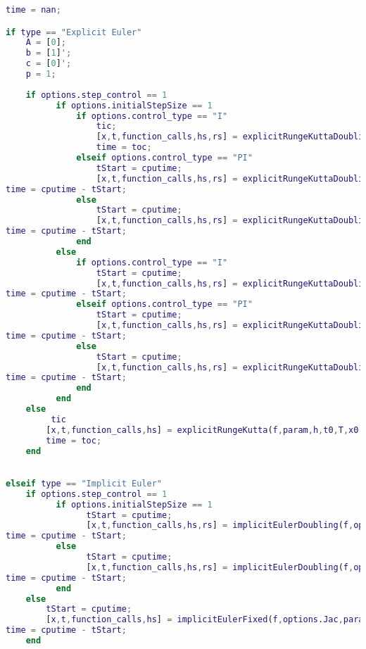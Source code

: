 \begin{lstlisting}[language=Matlab,caption=ODEsolver wrapper,label=lst0:wrapper]
time = nan;

if type == "Explicit Euler"
    A = [0];
    b = [1]';
    c = [0]';
    p = 1;
    
    if options.step_control == 1 
          if options.initialStepSize == 1
              if options.control_type == "I"
                  tic;
                  [x,t,function_calls,hs,rs] = explicitRungeKuttaDoubling(f,param,h,t0,T,x0,A,b,c,Atol,Rtol,hmin,hmax,eps_tol,p,true); % euler with everything
                  time = toc;
              elseif options.control_type == "PI"
                  tStart = cputime;
                  [x,t,function_calls,hs,rs] = explicitRungeKuttaDoublingPI(f,param,h,t0,T,x0,A,b,c,Atol,Rtol,hmin,hmax,eps_tol,p,true); % euler with everything
time = cputime - tStart;
              else
                  tStart = cputime;
                  [x,t,function_calls,hs,rs] = explicitRungeKuttaDoublingPID(f,param,h,t0,T,x0,A,b,c,Atol,Rtol,hmin,hmax,eps_tol,p,true); % euler with everything
time = cputime - tStart;
              end
          else
              if options.control_type == "I"
                  tStart = cputime;
                  [x,t,function_calls,hs,rs] = explicitRungeKuttaDoubling(f,param,h,t0,T,x0,A,b,c,Atol,Rtol,hmin,hmax,eps_tol,p,false); % euler with everything
time = cputime - tStart;
              elseif options.control_type == "PI"
                  tStart = cputime;
                  [x,t,function_calls,hs,rs] = explicitRungeKuttaDoublingPI(f,param,h,t0,T,x0,A,b,c,Atol,Rtol,hmin,hmax,eps_tol,p,false); % euler with everything
time = cputime - tStart;
              else
                  tStart = cputime;
                  [x,t,function_calls,hs,rs] = explicitRungeKuttaDoublingPID(f,param,h,t0,T,x0,A,b,c,Atol,Rtol,hmin,hmax,eps_tol,p,false); % euler with everything
time = cputime - tStart;
              end
          end
    else
         tic
        [x,t,function_calls,hs] = explicitRungeKutta(f,param,h,t0,T,x0,A,b,c); % Standard euler
        time = toc;
    end

    
elseif type == "Implicit Euler"
    if options.step_control == 1 
          if options.initialStepSize == 1
                tStart = cputime;
                [x,t,function_calls,hs,rs] = implicitEulerDoubling(f,options.Jac,param,h,t0,T,x0,Atol,Rtol,hmin,hmax,eps_tol,options.initialStepSize,newtonTolerance, newtonMaxiterations); % euler with everything
time = cputime - tStart;
          else
                tStart = cputime;
                [x,t,function_calls,hs,rs] = implicitEulerDoubling(f,options.Jac,param,h,t0,T,x0,Atol,Rtol,hmin,hmax,eps_tol,options.initialStepSize,newtonTolerance, newtonMaxiterations); % euler with step control only
time = cputime - tStart;
          end
    else
        tStart = cputime;
        [x,t,function_calls,hs] = implicitEulerFixed(f,options.Jac,param,h,t0,T,x0,newtonTolerance,newtonMaxiterations); % Standard euler
time = cputime - tStart;
    end
    

\end{lstlisting}
